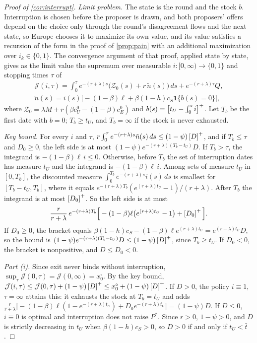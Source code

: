 \begin{proof}[Proof of \cref{cor:interrupt}]
\emph{Limit problem.} The state is the round and the stock $b$. Interruption is chosen before the proposer is drawn, and both proposers' offers depend on the choice only through the round's disagreement flows and the next state, so Europe chooses it to maximize its own value, and its value satisfies a recursion of the form in the proof of \cref{prop:pain} with an additional maximization over $i_k\in\{0,1\}$. The convergence argument of that proof, applied state by state, gives as the limit value the supremum over measurable $i:[0,\infty)\to\{0,1\}$ and stopping times $\tau$ of
\begin{gather*}
\mathcal J(i,\tau)=\int_0^\tau e^{-(r+\lambda)s}\big(\mathcal Z_0(s)+r\,\tilde n(s)\big)\,ds+e^{-(r+\lambda)\tau}Q,\\
\tilde n(s)=i(s)\big[-(1-\beta)\ell+\beta(1-h)c_S\mathbf 1\{b(s)=0\}\big],
\end{gather*}
where $\mathcal Z_0=\lambda M+r(\beta c^0_U-(1-\beta)c^0_E)$ and $b(s)=\left[t_U-\int_0^s i\right]^{+}$. Let $T_b$ be the first date with $b=0$; $T_b\ge t_U$, and $T_b=\infty$ if the stock is never exhausted.

\emph{Key bound.} For every $i$ and $\tau$, $r\int_0^\tau e^{-(r+\lambda)s}\tilde n(s)\,ds\le(1-\psi)\left[D\right]^{+}$, and if $T_b\le\tau$ and $D_0\ge 0$, the left side is at most $(1-\psi)e^{-(r+\lambda)(T_b-t_U)}D$. If $T_b>\tau$, the integrand is $-(1-\beta)\ell\,i\le 0$. Otherwise, before $T_b$ the set of interruption dates has measure $t_U$ and the integrand is $-(1-\beta)\ell\,i$. Among sets of measure $t_U$ in $[0,T_b]$, the discounted measure $\int_0^{T_b}e^{-(r+\lambda)s}i(s)\,ds$ is smallest for $[T_b-t_U,T_b]$, where it equals $e^{-(r+\lambda)T_b}(e^{(r+\lambda)t_U}-1)/(r+\lambda)$. After $T_b$ the integrand is at most $\left[D_0\right]^{+}$. So the left side is at most
\[
\frac{r}{r+\lambda}\,e^{-(r+\lambda)T_b}\Big[-(1-\beta)\ell\big(e^{(r+\lambda)t_U}-1\big)+\left[D_0\right]^{+}\Big].
\]
If $D_0\ge 0$, the bracket equals $\beta(1-h)c_S-(1-\beta)\ell e^{(r+\lambda)t_U}=e^{(r+\lambda)t_U}D$, so the bound is $(1-\psi)e^{-(r+\lambda)(T_b-t_U)}D\le(1-\psi)\left[D\right]^{+}$, since $T_b\ge t_U$. If $D_0<0$, the bracket is nonpositive, and $D\le D_0<0$.

\emph{Part (i).} Since exit never binds without interruption, $\sup_\tau\mathcal J(0,\tau)=\mathcal J(0,\infty)=x^\circ_0$. By the key bound, $\mathcal J(i,\tau)\le\mathcal J(0,\tau)+(1-\psi)\left[D\right]^{+}\le x^\circ_0+(1-\psi)\left[D\right]^{+}$. If $D>0$, the policy $i\equiv 1$, $\tau=\infty$ attains this: it exhausts the stock at $T_b=t_U$ and adds $\frac{r}{r+\lambda}\big[-(1-\beta)\ell(1-e^{-(r+\lambda)t_U})+D_0e^{-(r+\lambda)t_U}\big]=(1-\psi)D$. If $D\le 0$, $i\equiv 0$ is optimal and interruption does not raise $P^*$. Since $r>0$, $1-\psi>0$, and $D$ is strictly decreasing in $t_U$ when $\beta(1-h)c_S>0$, so $D>0$ if and only if $t_U<\bar t$.


\end{proof}
